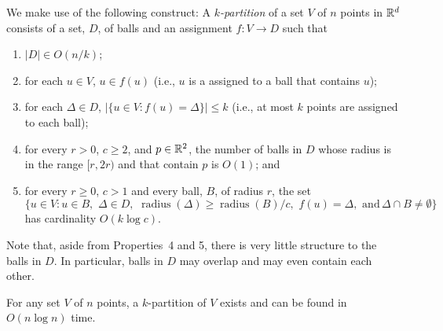 \documentclass{patmorin}
\DeclareMathOperator{\radius}{radius}
\newcommand{\mand}{\mathrm{,\,\,and\,}}
\newcommand{\oand}{\mathrm{,\,\,}}
\begin{document}
We make use of the following construct:  A \emph{$k$-partition} of a
set $V$ of $n$ points in $\mathbb{R}^d$ consists of a set, $D$, of balls and an
assignment $f:V\to D$ such that
\begin{enumerate}
  \item $|D|\in O(n/k)$;
  \item for each $u\in V$, $u\in f(u)$ (i.e., $u$ is a assigned to a
    ball that contains $u$);
  \item for each $\Delta\in D$, $|\{u\in V: f(u)=\Delta\}|\le k$ (i.e.,
   at most $k$ points are assigned to each ball);
  \item for every $r> 0$, $c\ge 2$, and $p\in\mathbb{R}^2$, the number of balls
   in $D$ whose radius is in the range $[r,2r)$ and that contain $p$
   is $O(1)$; and
  \item for every $r\ge 0$, $c>1$ and every ball, $B$, of radius $r$, the set
    \[  \{ u\in V : u\in B\oand \Delta\in D\oand \radius(\Delta)\ge\radius(B)/c\oand f(u)=\Delta\mand \Delta\cap B\neq\emptyset\} \]
   has cardinality $O(k\log c)$.
\end{enumerate}

Note that, aside from Properties~4 and 5, there is very little structure to
the balls in $D$. In particular, balls in $D$ may overlap and may even
contain each other.

\begin{lem}
  For any set $V$ of $n$ points, a $k$-partition of $V$ exists and can
  be found in $O(n\log n)$ time.
\end{lem}
\end{document}
